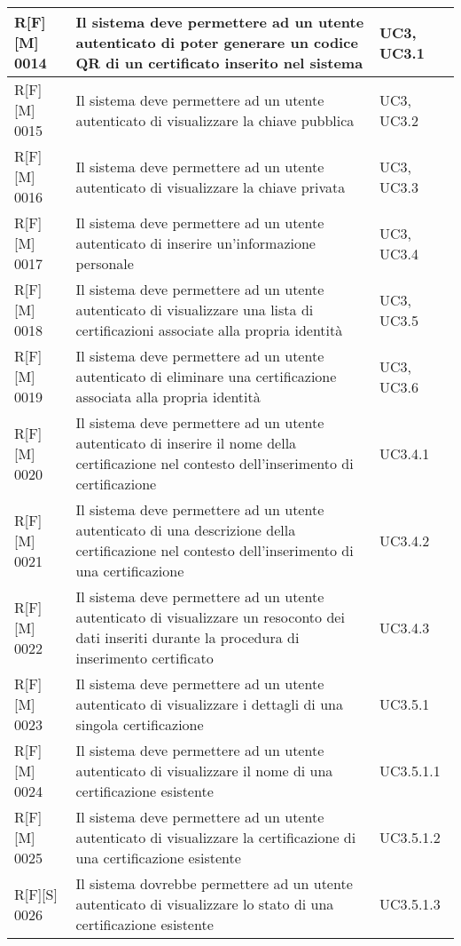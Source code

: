 \begin{table}
\begin{tabularx}{\textwidth}{lXl}
\hline
R[F][M] 0014     & Il sistema deve permettere ad un utente autenticato di poter generare un codice QR di un certificato inserito nel sistema & UC3, UC3.1 \\
\hline
R[F][M] 0015     & Il sistema deve permettere ad un utente autenticato di visualizzare la chiave pubblica & UC3, UC3.2 \\
\hline
R[F][M] 0016     & Il sistema deve permettere ad un utente autenticato di visualizzare la chiave privata & UC3, UC3.3 \\
\hline
R[F][M] 0017     & Il sistema deve permettere ad un utente autenticato di inserire un’informazione personale & UC3, UC3.4 \\
\hline
R[F][M] 0018     & Il sistema deve permettere ad un utente autenticato di visualizzare una lista di certificazioni associate alla propria identità & UC3, UC3.5 \\
\hline
R[F][M] 0019     & Il sistema deve permettere ad un utente autenticato di eliminare una certificazione associata alla propria identità & UC3, UC3.6 \\
\hline
R[F][M] 0020     & Il sistema deve permettere ad un utente autenticato di inserire il nome della certificazione nel contesto dell’inserimento di certificazione & UC3.4.1 \\
\hline
R[F][M] 0021     & Il sistema deve permettere ad un utente autenticato di una descrizione della certificazione nel contesto dell’inserimento di una certificazione & UC3.4.2 \\
\hline
R[F][M] 0022     & Il sistema deve permettere ad un utente autenticato di visualizzare un resoconto dei dati inseriti durante la procedura di inserimento certificato & UC3.4.3 \\
\hline
R[F][M] 0023     & Il sistema deve permettere ad un utente autenticato di visualizzare i dettagli di una singola certificazione & UC3.5.1 \\
\hline
R[F][M] 0024     & Il sistema deve permettere ad un utente autenticato di visualizzare il nome di una certificazione esistente & UC3.5.1.1 \\
\hline
R[F][M] 0025     & Il sistema deve permettere ad un utente autenticato di visualizzare la certificazione di una certificazione esistente & UC3.5.1.2 \\
\hline
R[F][S] 0026     & Il sistema dovrebbe permettere ad un utente autenticato di visualizzare lo stato di una certificazione esistente & UC3.5.1.3 \\
\hline
\end{tabularx}
\end{table}%



